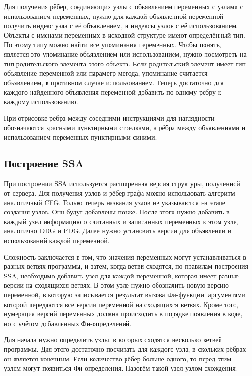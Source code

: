 Для получения рёбер, соединяющих узлы с объявлением переменных с узлами с использованием переменных, нужно для каждой объявленной переменной получить индекс узла с её объявлением, и индексы узлов с её использованием. Объекты с именами переменных в исходной структуре имеют определённый тип. По этому типу можно найти все упоминания переменных. Чтобы понять, является это упоминание объявлением или использованием, нужно посмотреть на тип родительского элемента этого объекта. Если родительский элемент имеет тип объявление переменной или параметр метода, упоминание считается объявлением, в противном случае использованием. Теперь достаточно для каждого найденного объявления переменной добавить по одному ребру к каждому использованию.

При отрисовке ребра между соседними инструкциями для наглядности обозначаются красными пунктирными стрелками, а рёбра между объявлениями и использованием переменных пунктирными синими.
\subsection{Построение SSA} \label{ch2:subsec-title-abbr}

При построении SSA используется расширенная версия структуры, полученной от сервера. Для получения узлов и рёбер графа можно использовать алгоритм, аналогичный CFG. Только теперь названия узлов не указываются на этапе создания узлов. Они будут добавлены позже. После этого нужно добавить в каждый узел информацию о считанных и записанных переменных в этом узле, аналогично DDG и PDG. Далее нужно установить версии для объявлений и использований каждой переменной.

Сложность заключается в том, что значения переменных могут устанавливаться в разных ветвях программы, и затем, когда ветви сходятся, по правилам построения SSA, необходимо добавить узел для каждой переменной, которая имеет разные версии на сходящихся ветвях. В этом узле нужно обозначить новую версию переменной, в которую записывается результат вызова Фи-функции, аргументами которой передаются все версии переменной на сходящихся ветвях. Кроме того, нумерация версий переменных должна происходить в порядке появления в коде, но с учётом добавленных Фи-определений.

Для начала нужно определить узлы, в которых сходятся несколько ветвей программы. Для этого достаточно посчитать для каждого узла, в скольких рёбрах он является конечным. Если количество рёбер больше одного, то перед этим узлом могут появиться Фи-определения. Назовём такой узел узлом схождения.

